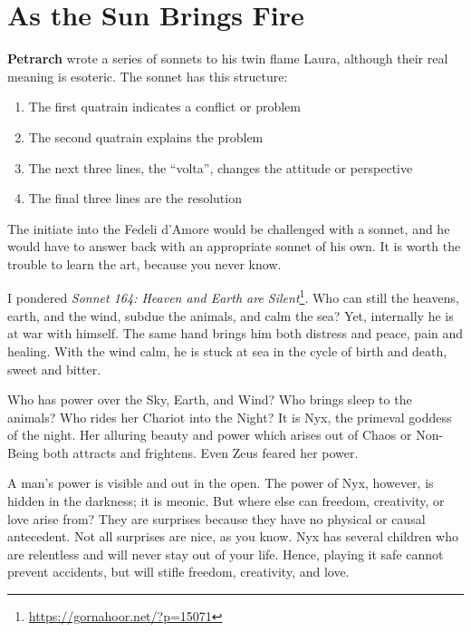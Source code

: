 \section{As the Sun Brings Fire}

\textbf{Petrarch} wrote a series of sonnets to his twin flame Laura, although their real meaning is esoteric. The sonnet has this structure:

\begin{enumerate}
\item The first quatrain indicates a conflict or problem

\item The second quatrain explains the problem

\item The next three lines, the ``volta'', changes the attitude or perspective

\item The final three lines are the resolution
\end{enumerate}

The initiate into the Fedeli d'Amore would be challenged with a sonnet, and he would have to answer back with an appropriate sonnet of his own. It is worth the trouble to learn the art, because you never know.

I pondered \textit{Sonnet 164: Heaven and Earth are Silent}\footnote{\url{https://gornahoor.net/?p=15071}}. Who can still the heavens, earth, and the wind, subdue the animals, and calm the sea? Yet, internally he is at war with himself. The same hand brings him both distress and peace, pain and healing. With the wind calm, he is stuck at sea in the cycle of birth and death, sweet and bitter.

Who has power over the Sky, Earth, and Wind? Who brings sleep to the animals? Who rides her Chariot into the Night? It is Nyx, the primeval goddess of the night. Her alluring beauty and power which arises out of Chaos or Non-Being both attracts and frightens. Even Zeus feared her power.

A man's power is visible and out in the open. The power of Nyx, however, is hidden in the darkness; it is meonic. But where else can freedom, creativity, or love arise from? They are surprises because they have no physical or causal antecedent. Not all surprises are nice, as you know. Nyx has several children who are relentless and will never stay out of your life. Hence, playing it safe cannot prevent accidents, but will stifle freedom, creativity, and love.

